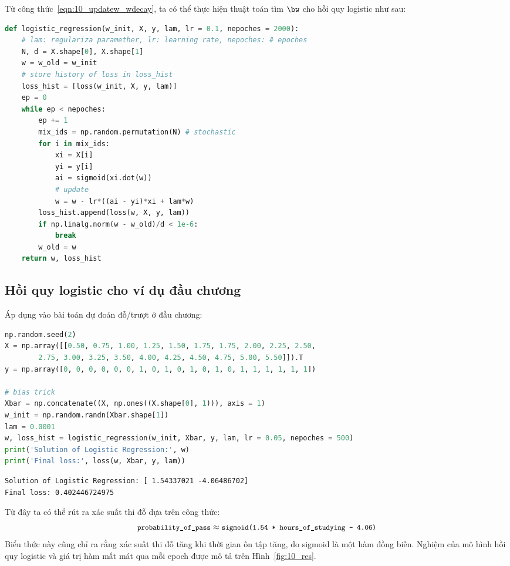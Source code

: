 Từ công thức~\eqref{eqn:10_updatew_wdecay}, ta có thể thực hiện thuật toán tìm $\bw$ cho hồi quy logistic như sau:
\newpage 

\begin{lstlisting}[language=Python]
def logistic_regression(w_init, X, y, lam, lr = 0.1, nepoches = 2000):
    # lam: regulariza paramether, lr: learning rate, nepoches: # epoches
    N, d = X.shape[0], X.shape[1]
    w = w_old = w_init 
    # store history of loss in loss_hist
    loss_hist = [loss(w_init, X, y, lam)]
    ep = 0 
    while ep < nepoches: 
        ep += 1
        mix_ids = np.random.permutation(N) # stochastic 
        for i in mix_ids:
            xi = X[i]
            yi = y[i]
            ai = sigmoid(xi.dot(w))
            # update
            w = w - lr*((ai - yi)*xi + lam*w)
        loss_hist.append(loss(w, X, y, lam))
        if np.linalg.norm(w - w_old)/d < 1e-6:
            break 
        w_old = w
    return w, loss_hist 
\end{lstlisting}

\subsection{Hồi quy logistic cho ví dụ đầu chương}
Áp dụng vào bài toán dự đoán đỗ/trượt ở đầu chương: 
\begin{lstlisting}[language=Python]
np.random.seed(2)
X = np.array([[0.50, 0.75, 1.00, 1.25, 1.50, 1.75, 1.75, 2.00, 2.25, 2.50, 
        2.75, 3.00, 3.25, 3.50, 4.00, 4.25, 4.50, 4.75, 5.00, 5.50]]).T
y = np.array([0, 0, 0, 0, 0, 0, 1, 0, 1, 0, 1, 0, 1, 0, 1, 1, 1, 1, 1, 1])

# bias trick 
Xbar = np.concatenate((X, np.ones((X.shape[0], 1))), axis = 1)
w_init = np.random.randn(Xbar.shape[1])
lam = 0.0001
w, loss_hist = logistic_regression(w_init, Xbar, y, lam, lr = 0.05, nepoches = 500)
print('Solution of Logistic Regression:', w)
print('Final loss:', loss(w, Xbar, y, lam))
\end{lstlisting}
\kq
\begin{lstlisting}
Solution of Logistic Regression: [ 1.54337021 -4.06486702]
Final loss: 0.402446724975
\end{lstlisting}

Từ đây ta có thể rút ra xác suất thi đỗ dựa trên công thức: 
\begin{equation*}
\small
\text{\texttt{probability\_of\_pass}} \approx \texttt{sigmoid(1.54
* hours\_of\_studying - 4.06)}
\end{equation*}
Biểu thức này cũng chỉ ra rằng xác suất thi đỗ tăng khi thời gian ôn tập
tăng, do sigmoid là một hàm đồng biến. Nghiệm của mô hình hồi quy logistic
và giá trị hàm mất mát qua mỗi epoch được mô tả trên Hình~\ref{fig:10_res}.



